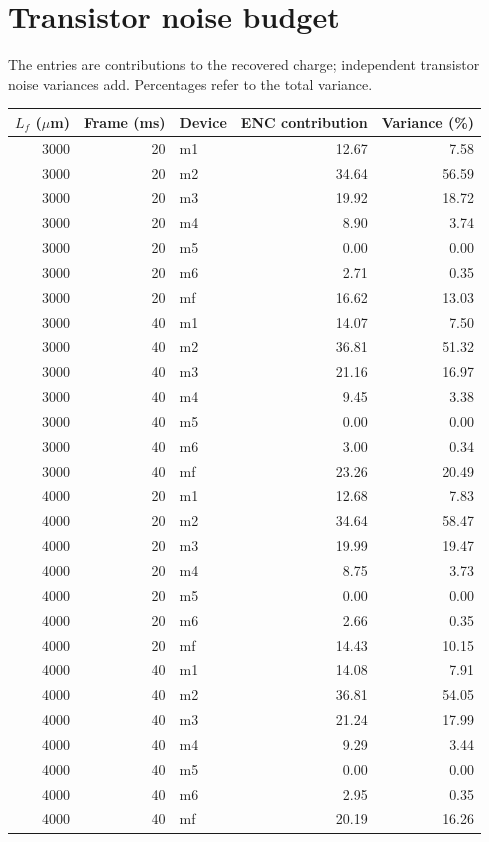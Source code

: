 \documentclass[10pt,a4paper]{article}
\begin{document}
\section{Transistor noise budget}
The entries are contributions to the recovered charge; independent transistor
noise variances add. Percentages refer to the total variance.
\begin{center}\scriptsize\begin{longtable}{rrlrr}\toprule
$L_f$ ($\mu$m) & Frame (ms) & Device & ENC contribution & Variance (\%)\\\midrule
3000 & 20 & m1 & 12.67 & 7.58 \\
3000 & 20 & m2 & 34.64 & 56.59 \\
3000 & 20 & m3 & 19.92 & 18.72 \\
3000 & 20 & m4 & 8.90 & 3.74 \\
3000 & 20 & m5 & 0.00 & 0.00 \\
3000 & 20 & m6 & 2.71 & 0.35 \\
3000 & 20 & mf & 16.62 & 13.03 \\
3000 & 40 & m1 & 14.07 & 7.50 \\
3000 & 40 & m2 & 36.81 & 51.32 \\
3000 & 40 & m3 & 21.16 & 16.97 \\
3000 & 40 & m4 & 9.45 & 3.38 \\
3000 & 40 & m5 & 0.00 & 0.00 \\
3000 & 40 & m6 & 3.00 & 0.34 \\
3000 & 40 & mf & 23.26 & 20.49 \\
4000 & 20 & m1 & 12.68 & 7.83 \\
4000 & 20 & m2 & 34.64 & 58.47 \\
4000 & 20 & m3 & 19.99 & 19.47 \\
4000 & 20 & m4 & 8.75 & 3.73 \\
4000 & 20 & m5 & 0.00 & 0.00 \\
4000 & 20 & m6 & 2.66 & 0.35 \\
4000 & 20 & mf & 14.43 & 10.15 \\
4000 & 40 & m1 & 14.08 & 7.91 \\
4000 & 40 & m2 & 36.81 & 54.05 \\
4000 & 40 & m3 & 21.24 & 17.99 \\
4000 & 40 & m4 & 9.29 & 3.44 \\
4000 & 40 & m5 & 0.00 & 0.00 \\
4000 & 40 & m6 & 2.95 & 0.35 \\
4000 & 40 & mf & 20.19 & 16.26 \\
\bottomrule\end{longtable}\end{center}
\end{document}
